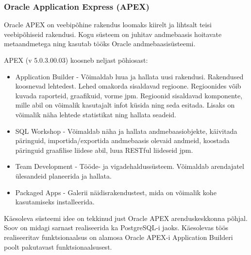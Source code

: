 \documentclass[a4paper,12pt]{article} %
\begin{document}
\subsubsection{Oracle Application Express (APEX)}
Oracle APEX on veebipõhine rakendus loomaks kiirelt ja lihtsalt teisi veebipõhiseid rakendusi. Kogu süsteem on juhitav andmebaasis hoitavate metaandmetega ning kasutab tööks Oracle andmebaasisüsteemi.\par
APEX (v 5.0.3.00.03) koosneb neljast põhiosast:
\begin{itemize}
\item Application Builder - Võimaldab luua ja hallata uusi rakendusi. Rakendused koosnevad lehtedest. Lehed omakorda sisaldavad regioone. Regioonides võib kuvada raporteid, graafikuid, vorme jpm. Regioonid sisaldavad komponente, mille abil on võimalik kasutajalt infot küsida ning seda esitada. Lisaks on võimalik näha lehtede statistikat ning hallata seadeid.
\item SQL Workshop - Võimaldab näha ja hallata andmebaasiobjekte, käivitada päringuid, importida/exportida andmebaasis olevaid andmeid, koostada päringuid graafilise liidese abil, luua RESTful liideseid jpm.
\item Team Development - Tööde- ja vigadehaldussüsteem. Võimaldab arendajatel ülesandeid planeerida ja hallata.
\item Packaged Apps - Galerii näidisrakendustest, mida on võimalik kohe kasutamiseks installeerida.
\end{itemize}
\cite{Oracle_APEX}
Käesoleva süsteemi idee on tekkinud just Oracle APEX arenduskeskkonna põhjal. Soov on midagi sarnast realiseerida ka PostgreSQL-i jaoks. Käesolevas töös realiseeritav funktsionaalsus on alamosa Oracle APEX-i Application Builderi poolt pakutavast funktsionaalsusest.
\end{document}
